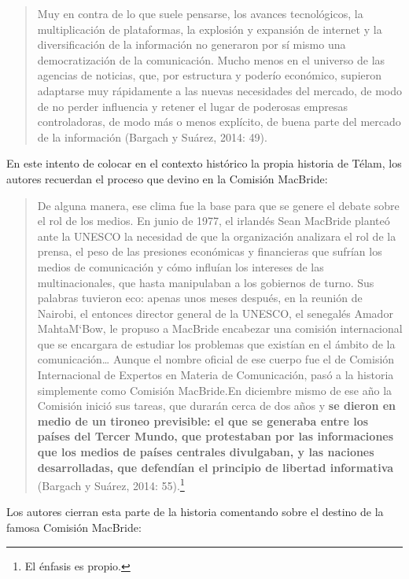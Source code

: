 {\begin{quote}
Muy en contra de lo que suele pensarse, los avances tecnológicos, la multiplicación de plataformas, la explosión y expansión de internet y la diversificación de la información no generaron por sí mismo una democratización de la comunicación. Mucho menos en el universo de las agencias de noticias, que, por estructura y poderío económico, supieron adaptarse muy rápidamente a las nuevas necesidades del mercado, de modo de no perder influencia y retener el lugar de poderosas empresas controladoras, de modo más o menos explícito, de buena parte del mercado de la información (Bargach y Suárez, 2014: 49).
\end{quote}

En este intento de colocar en el contexto histórico la propia historia de Télam, los autores recuerdan el proceso que devino en la Comisión MacBride:

\begin{quote}
De alguna manera, ese clima fue la base para que se genere el debate sobre el rol de los medios. En junio de 1977, el irlandés Sean MacBride planteó ante la UNESCO la necesidad de que la organización analizara el rol de la prensa, el peso de las presiones económicas y financieras que sufrían los medios de comunicación y cómo influían los intereses de las multinacionales, que hasta manipulaban a los gobiernos de turno. Sus palabras tuvieron eco: apenas unos meses después, en la reunión de Nairobi, el entonces director general de la UNESCO, el senegalés Amador MahtaM`Bow, le propuso a MacBride encabezar una comisión internacional que se encargara de estudiar los problemas que existían en el ámbito de la comunicación\ldots{} Aunque el nombre oficial de ese cuerpo fue el de Comisión Internacional de Expertos en Materia de Comunicación, pasó a la historia simplemente como Comisión MacBride.En diciembre mismo de ese año la Comisión inició sus tareas, que durarán cerca de dos años y \textbf{se dieron en medio de un tironeo previsible: el que se generaba entre los países del Tercer Mundo, que protestaban por las informaciones que los medios de países centrales divulgaban, y las naciones desarrolladas, que defendían el principio de libertad informativa} (Bargach y Suárez, 2014: 55).\footnote{El énfasis es propio.}
\end{quote}

Los autores cierran esta parte de la historia comentando sobre el destino de la famosa Comisión MacBride:

}
